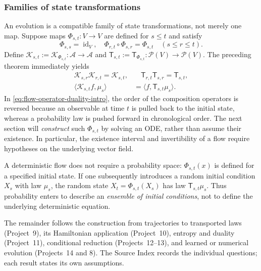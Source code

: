\documentclass[12pt,a4paper,oneside]{book}
\begin{document}
\subsubsection{Families of state transformations}
An evolution is a compatible family of state transformations, not merely one map. Suppose maps $\Phi_{s,t}:V\to V$ are
defined for $s\leq t$ and satisfy
\begin{equation*}
    \Phi_{s,s}=\operatorname{id}_V, \quad \Phi_{r,t}\circ\Phi_{s,r}=\Phi_{s,t} \quad (s\leq r\leq t).
\end{equation*}
Define $\mathcal{K}_{s,t}:=\mathcal{K}_{\Phi_{s,t}}:\mathcal A\to\mathcal A$ and $\mathsf T_{s,t}:=\mathsf T_{\Phi_{s,t}}:\mathcal P(V)\to\mathcal P(V)$.
The preceding theorem immediately yields
\begin{equation}
    \begin{aligned}
        \mathcal{K}_{s,r}\mathcal{K}_{r,t} = \mathcal{K}_{s,t}, &\quad
        \mathsf T_{r,t}\mathsf T_{s,r}=\mathsf T_{s,t},\\
        \langle \mathcal{K}_{s,t}f,\mu_s\rangle &=\langle f,\mathsf T_{s,t}\mu_s\rangle.
    \end{aligned}
    \label{eq:flow-operator-duality-intro}
\end{equation}
In \eqref{eq:flow-operator-duality-intro}, the order of the composition operators is reversed because an observable
at time $t$ is pulled back to the initial state, whereas a probability
law is pushed forward in chronological order. The next section will
\emph{construct} such $\Phi_{s,t}$ by solving an ODE, rather than assume
their existence. In particular, the existence interval and invertibility
of a flow require hypotheses on the underlying vector field.

A deterministic flow does not require a probability space: $\Phi_{s,t}(x)$ is defined for a specified initial state. If
one subsequently introduces a random initial condition $X_s$ with law $\mu_s$, the random state $X_t=\Phi_{s,t}(X_s)$ has
law $\mathsf T_{s,t}\mu_s$. Thus probability enters to describe an \emph{ensemble of initial conditions}, not to define
the underlying deterministic equation.

The remainder follows the construction from trajectories to transported laws (Project~9), its Hamiltonian application
(Project~10), entropy and duality (Project~11), conditional reduction (Projects~12--13), and learned or numerical evolution
(Projects~14 and 8). The Source Index records the individual questions; each result states its own assumptions.
\end{document}
